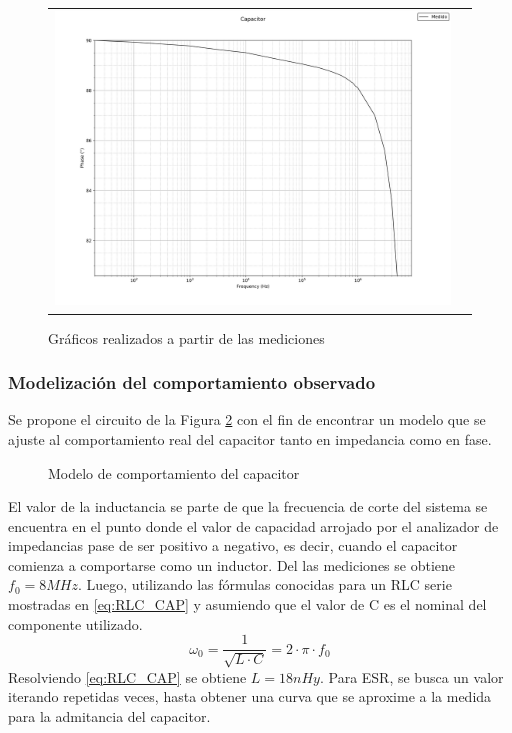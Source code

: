 \begin{figure}[H]
{\begin{tabular}{c c}
            \includegraphics{Recursos/fase_medida_cap.png}

        \end{tabular}
    }
    \caption{Gr\'aficos realizados a partir de las mediciones}
    \label{fig:Med_CAP}
    
\end{figure}    


\subsubsection{Modelizaci\'on del comportamiento observado}
Se propone el circuito de la Figura \ref{fig:modelo_CAP} con el fin de encontrar un modelo que se ajuste al comportamiento real del capacitor tanto en impedancia como en fase.
\begin{figure}[H]
    \centering
    \caption{Modelo de comportamiento del capacitor}
    \label{fig:modelo_CAP}
\end{figure}
El valor de la inductancia se parte de que la frecuencia de corte del sistema se encuentra en el punto donde el valor de capacidad arrojado por el analizador de impedancias pase de ser positivo a negativo, es decir, cuando el capacitor comienza a comportarse como un inductor. Del las mediciones se obtiene $f_{0} = 8MHz$. Luego, utilizando las f\'ormulas conocidas para un RLC serie mostradas en \ref{eq:RLC_CAP} y asumiendo que el valor de C es el nominal del componente utilizado.
\begin{equation}
    \omega_0 = \frac{1}{\sqrt{L \cdot C}} = 2 \cdot \pi \cdot f_0
    \label{eq:RLC_CAP}
\end{equation}
Resolviendo \ref{eq:RLC_CAP} se obtiene $L = 18nHy$.
Para ESR, se busca un valor iterando repetidas veces, hasta obtener una curva que se aproxime a la medida para la admitancia del capacitor.

